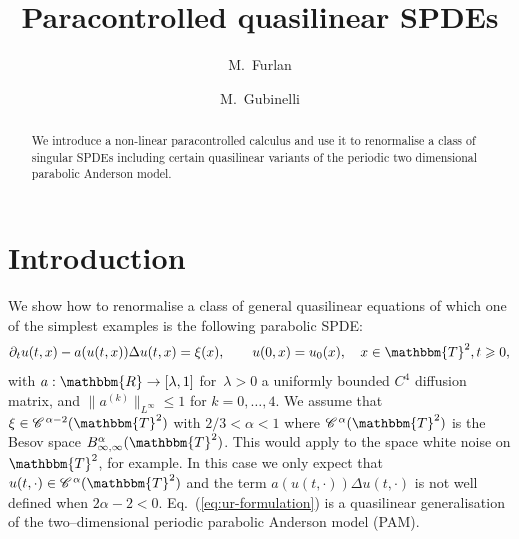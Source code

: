 \documentclass[11pt,reqno]{amsart}
\newcommand{\nospace}{}
\newcommand{\CC}{\mathscr{C} \hspace{.1em}}
\begin{document}
\title{Paracontrolled quasilinear SPDEs}

\author{M.~Furlan}
\address{CEREMADE\\
Universit{\'e} Paris Dauphine, France}

\author{ M.~Gubinelli}
\address{IAM \& HCM\\
Universit{\"a}t Bonn, Germany}

\begin{abstract}
  We introduce a non-linear paracontrolled calculus and use it to renormalise
  a class of singular SPDEs including certain quasilinear variants of the
  periodic two dimensional parabolic Anderson model.
\end{abstract}

{\maketitle}

\section{Introduction}

We show how to renormalise a class of general quasilinear equations of which
one of the simplest examples is the following parabolic SPDE:
\begin{equation}
  \partial_t u (t, x) - a (u (t, x)) \Delta u (t, x) = \xi (x), \qquad u (0,
  x) = u_0 (x), \quad x \in \mathbbm{T}^2, t \geqslant 0,
  \label{eq:ur-formulation}
\end{equation}
with $a : \mathbbm{R} \rightarrow [\lambda, 1]$ for~$\lambda > 0$ a uniformly
bounded $C^4$ diffusion matrix, and $\| a^{(k)} \|_{L^{\infty}} \leqslant 1$
for $k = 0, \ldots, 4$. We assume that $\xi \in \CC \nospace^{\alpha - 2}
(\mathbbm{T}^2)$ with $2 / 3 < \alpha < 1$ where $\CC^{\alpha}
(\mathbbm{T}^2)$ is the Besov space $B^{\alpha}_{\infty, \infty}
(\mathbbm{T}^2)$. This would apply to the space white noise on
$\mathbbm{T}^2$, for example. In this case we only expect that $u (t, \cdot)
\in \CC^{\alpha} (\mathbbm{T}^2)$ and the term $a (u (t, \cdot)) \Delta u (t,
\cdot)$ is not well defined when $2 \alpha - 2 < 0$.
Eq.~(\ref{eq:ur-formulation}) is a quasilinear generalisation of the
two--dimensional periodic parabolic Anderson model (PAM).
\end{document}
